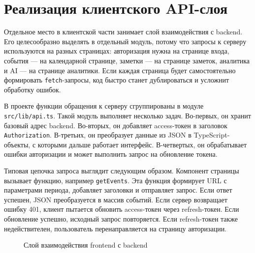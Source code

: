 \documentclass[14pt,a4paper]{extreport}
\begin{document}
\section{Реализация клиентского API-слоя}

Отдельное место в клиентской части занимает слой взаимодействия с backend. Его целесообразно выделять в отдельный модуль, потому что запросы к серверу используются на разных страницах: авторизация нужна на странице входа, события --- на календарной странице, заметки --- на странице заметок, аналитика и AI --- на странице аналитики. Если каждая страница будет самостоятельно формировать \texttt{fetch}-запросы, код быстро станет дублироваться и усложнит обработку ошибок.

В проекте функции обращения к серверу сгруппированы в модуле \texttt{src/lib/api.ts}. Такой модуль выполняет несколько задач. Во-первых, он хранит базовый адрес backend. Во-вторых, он добавляет access-токен в заголовок \texttt{Authorization}. В-третьих, он преобразует данные из JSON в TypeScript-объекты, с которыми дальше работает интерфейс. В-четвертых, он обрабатывает ошибки авторизации и может выполнить запрос на обновление токена.

Типовая цепочка запроса выглядит следующим образом. Компонент страницы вызывает функцию, например \texttt{getEvents}. Эта функция формирует URL с параметрами периода, добавляет заголовки и отправляет запрос. Если ответ успешен, JSON преобразуется в массив событий. Если сервер возвращает ошибку 401, клиент пытается обновить access-токен через refresh-токен. Если обновление успешно, исходный запрос повторяется. Если refresh-токен также недействителен, пользователь перенаправляется на страницу авторизации.

\begin{figure}[H]
\centering
{}
\caption{Слой взаимодействия frontend с backend}
\end{figure}
\end{document}
